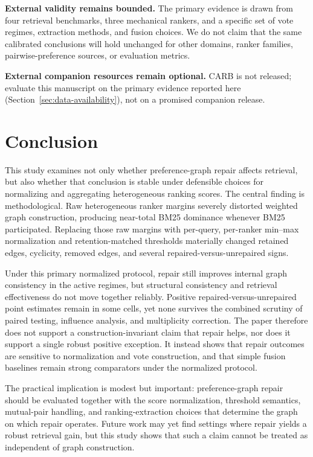 \documentclass[manuscript,anonymous,review]{acmart}
\begin{document}
\textbf{External validity remains bounded.} The primary evidence is drawn from
four retrieval benchmarks, three mechanical rankers, and a specific set of vote
regimes, extraction methods, and fusion choices. We do not claim that the same
calibrated conclusions will hold unchanged for other domains, ranker families,
pairwise-preference sources, or evaluation metrics.

\textbf{External companion resources remain optional.} CARB is not released;
evaluate this manuscript on the primary evidence reported here
(Section~\ref{sec:data-availability}), not on a promised companion release.

\section{Conclusion}
\label{sec:conclusion}

This study examines not only whether preference-graph repair affects retrieval,
but also whether that conclusion is stable under defensible choices for
normalizing and aggregating heterogeneous ranking scores. The central finding is
methodological. Raw heterogeneous ranker margins severely distorted weighted
graph construction, producing near-total BM25 dominance whenever BM25
participated. Replacing those raw margins with per-query, per-ranker min--max
normalization and retention-matched thresholds materially changed retained
edges, cyclicity, removed edges, and several repaired-versus-unrepaired signs.

Under this primary normalized protocol, repair still improves internal graph
consistency in the active regimes, but structural consistency and retrieval
effectiveness do not move together reliably. Positive repaired-versus-unrepaired
point estimates remain in some cells, yet none survives the combined scrutiny
of paired testing, influence analysis, and multiplicity correction. The paper
therefore does not support a construction-invariant claim that repair helps, nor
does it support a single robust positive exception. It instead shows that
repair outcomes are sensitive to normalization and vote construction, and that
simple fusion baselines remain strong comparators under the normalized
protocol.

The practical implication is modest but important: preference-graph repair
should be evaluated together with the score normalization, threshold semantics,
mutual-pair handling, and ranking-extraction choices that determine the graph on
which repair operates. Future work may yet find settings where repair yields a
robust retrieval gain, but this study shows that such a claim cannot be treated
as independent of graph construction.
\end{document}

